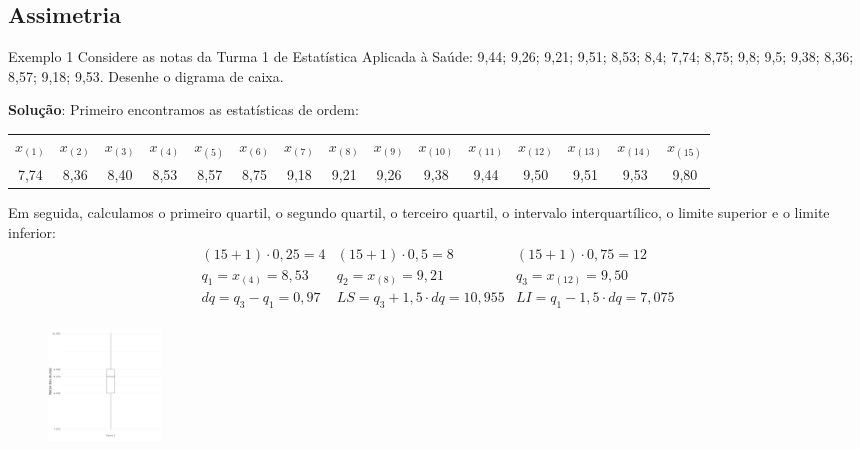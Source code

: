 \documentclass[8pt]{beamer}
\begin{document}
\subsection{Assimetria}

\begin{frame}{Exemplo 1}
	Considere as notas da Turma 1 de Estatística Aplicada à Saúde: 9,44; 9,26; 9,21; 9,51; 8,53; 8,4; 7,74; 8,75; 9,8; 9,5; 9,38; 8,36; 8,57; 9,18; 9,53. Desenhe o digrama de caixa.
	\vspace{0.5cm}
	
	\textbf{Solução}: Primeiro encontramos as estatísticas de ordem: 
	{\tiny		
	\begin{table}[ht]
		\centering
		\begin{tabular}{ccccccccccccccc}
			\toprule[0.05cm]
			$x_{(1)}$ & $x_{(2)}$ & $x_{(3)}$ & $x_{(4)}$ & $x_{(5)}$ & $x_{(6)}$ & $x_{(7)}$ & $x_{(8)}$ & $x_{(9)}$ & $x_{(10)}$ & $x_{(11)}$ & $x_{(12)}$ & $x_{(13)}$ & $x_{(14)}$ & $x_{(15)}$ \\ 
			7,74 & 8,36 & 8,40 & 8,53 & 8,57 & 8,75 & 9,18 & 9,21 & 9,26 & 9,38 & 9,44 & 9,50 & 9,51 & 9,53 & 9,80 \\ 
			\bottomrule[0.05cm]
		\end{tabular}
	\end{table}
	}
	
	Em seguida, calculamos o primeiro quartil, o segundo quartil, o terceiro quartil, o intervalo interquartílico, o limite superior e o limite inferior:
	\begin{align*}
	\begin{matrix}
	(15+1)\cdot 0,25= 4 & (15+1)\cdot 0,5= 8 & (15+1)\cdot 0,75= 12\\
	q_1= x_{(4)} = 8,53 & q_2 = x_{(8)} = 9,21 & q_3 = x_{(12)} = 9,50\\
	dq= q_3-q_1 = 0,97 & LS= q_3+1,5\cdot dq = 10,955 &  LI = q_1-1,5\cdot dq=7,075
	\end{matrix}
	\end{align*}
	\begin{figure}
		\centering
		\includegraphics[height=3cm]{asim_boxplot_turma_1.png}
	\end{figure}
\end{frame}
\end{document}
